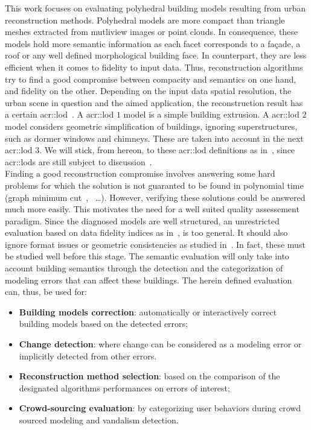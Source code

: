 \documentclass[runningheads]{llncs}
\begin{document}
    This work focuses on evaluating polyhedral building models resulting from urban reconstruction methods. Polyhedral models are more compact than triangle meshes extracted from mutliview images or point clouds. In consequence, these models hold more semantic information as each facet corresponds to a fa\c{c}ade, a roof or any well defined morphological building face. In counterpart, they are less efficient when it comes to fidelity to input data. Thus, reconstruction algorithms try to find a good compromise between compacity and semantics on one hand, and fidelity on the other. Depending on the input data spatial resolution, the urban scene in question and the aimed application, the reconstruction result has a certain \acrfull{acr::lod}~\cite{kolbe2005citygml}. A \acrshort{acr::lod} $1$ model is a simple building extrusion. A \acrshort{acr::lod} $2$ model considers geometric simplification of buildings, ignoring superstructures, such as dormer windows and chimneys. These are taken into account in the next \acrshort{acr::lod} $3$. We will stick, from hereon, to these \acrshort{acr::lod} definitions as in~\cite{verdie2015lod}, since \glspl{acr::lod} are still subject to discussion~\cite{2016_ceus_improved_lod}.\\

     Finding a good reconstruction compromise involves answering some hard problems for which the solution is not guaranted to be found in polynomial time {\color{blue} (graph minimum cut~\cite{Taillandier2005},~\cite{Bredif2008} \dots)}. However, verifying these solutions could be answered much more easily. This motivates the need for a well suited quality assessement paradigm. Since the diagnosed models are well structured, an unrestricted evaluation based on data fidelity indices as in~\cite{berger2013benchmark}, is too general. It should also ignore format issues or geometric consistencies as studied in~\cite{ledoux2018val3dity}. In fact, these must be studied well before this stage. The semantic evaluation will only take into account building semantics through the detection and the categorization of modeling errors that can affect these buildings. The herein defined evaluation can, thus, be used for:
    \begin{itemize}
        \item \textbf{Building models correction}: automatically or interactively correct building models based on the detected errors;
        \item \textbf{Change detection}: where change can be considered as a modeling error or implicitly detected from other errors.
        \item \textbf{Reconstruction method selection}: based on the comparison of the designated algorithms performances on errors of interest;
        \item \textbf{Crowd-sourcing evaluation}: by categorizing user behaviors during crowd sourced modeling and vandalism detection.
    \end{itemize}
\end{document}
